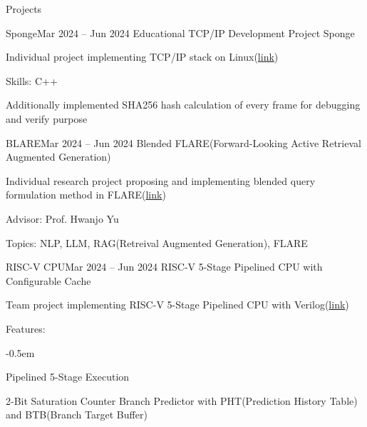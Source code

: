 \documentclass{resume}
\begin{document}
\begin{rSection}{Projects}
    \begin{rSubsection}{Sponge}{Mar 2024 -- Jun 2024}
        Educational TCP/IP Development Project Sponge

        \item Individual project implementing TCP/IP stack on Linux(\href{https://github.com/minsusun/csed353-sponge}{link})

        \item Skills: C++

        \item Additionally implemented SHA256 hash calculation of every frame for debugging and verify purpose
    \end{rSubsection}

    \begin{rSubsection}{BLARE}{Mar 2024 -- Jun 2024}
        Blended FLARE(Forward-Looking Active Retrieval Augmented Generation)

        \item Individual research project proposing and implementing blended query formulation method in FLARE(\href{https://github.com/minsusun/BLARE}{link})

        \item Advisor: Prof. Hwanjo Yu

        \item Topics: NLP, LLM, RAG(Retreival Augmented Generation), FLARE
    \end{rSubsection}

    \begin{rSubsection}{RISC-V CPU}{Mar 2024 -- Jun 2024}
        RISC-V 5-Stage Pipelined CPU with Configurable Cache

        \item Team project implementing RISC-V 5-Stage Pipelined CPU with Verilog(\href{https://github.com/minsusun/csed311/tree/main/lab5}{link})

        \item Features:
        \vspace{-0.5em}
        \begin{list}{--}{\setlength{\rightmargin}{1.5em}}
            \itemsep -0.5em

            \item Pipelined 5-Stage Execution

            \item 2-Bit Saturation Counter Branch Predictor with PHT(Prediction History Table) and BTB(Branch Target Buffer)


\end{list}
\end{rSubsection}
\end{rSection}
\end{document}

